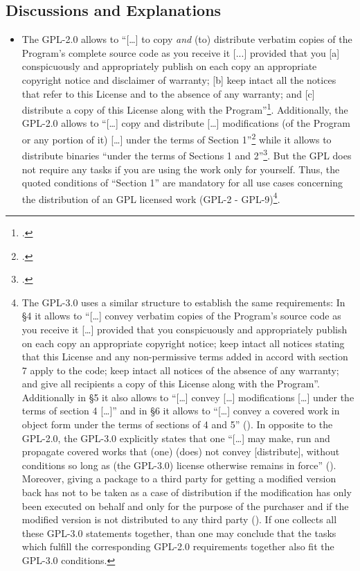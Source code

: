\subsection{Discussions and Explanations}

\begin{itemize}
  
  \item The GPL-2.0 allows to \enquote{[\ldots] to copy \emph{and} (to)
  distribute verbatim copies of the Program's complete source code as you
  receive it [...] provided that you [a] conspicuously and appropriately publish
  on each copy an appropriate copyright notice and disclaimer of warranty; [b]
  keep intact all the notices that refer to this License and to the absence of
  any warranty; and [c] distribute a copy of this License along with the
  Program}\footcite[cf.][\nopage wp.\ §1, emphasizes by
  KR]{Gpl20OsiLicense1991a}. Additionally, the GPL-2.0 allows to
  \enquote{[\ldots] copy and distribute [\ldots] modifications (of the Program
  or any portion of it) [\ldots] under the terms of Section
  1}\footcite[cf.][\nopage wp.\ §2]{Gpl20OsiLicense1991a} while it allows to
  distribute binaries \enquote{under the terms of Sections 1 and
  2}\footcite[cf.][\nopage wp.\ §4]{Gpl20OsiLicense1991a}. But the GPL does not
  require any tasks if you are using the work only for yourself. Thus, the
  quoted conditions of \enquote{Section 1} are mandatory for all use cases
  concerning the distribution of an GPL licensed work (GPL-2 - GPL-9)\footnote{
  \label{Gpl3ConditionsDistri}
  The GPL-3.0 uses a similar structure to establish the same requirements:
  In §4 it allows to \enquote{[\ldots] convey verbatim copies of the Program's
  source code as you receive it [\ldots] provided that you conspicuously and
  appropriately publish on each copy an appropriate copyright notice; keep
  intact all notices stating that this License and any non-permissive terms
  added in accord with section 7 apply to the code; keep intact all notices of
  the absence of any warranty; and give all recipients a copy of this License
  along with the Program}. Additionally in §5 it also allows to
  \enquote{[\ldots] convey [\ldots] modifications [\ldots] under the terms of
  section 4 [\ldots]} and in §6 it allows to \enquote{[\ldots] convey a covered
  work in object form under the terms of sections of 4 and 5}
  (\cite[cf.][\nopage wp.\ §4, §5, §6]{Gpl30OsiLicense2007a}). In opposite to
  the GPL-2.0, the GPL-3.0 explicitly states that one \enquote{[\ldots] may
  make, run and propagate covered works that (one) (does) not convey
  [distribute], without conditions so long as (the GPL-3.0) license otherwise
  remains in force} (\cite[cf.][\nopage wp.\ §2]{Gpl30OsiLicense2007a}).
  Moreover, giving a package to a third party for getting a modified version
  back has not to be taken as a case of distribution if the modification has
  only been executed on behalf and only for the purpose of the purchaser and if
  the modified version is not distributed to any third party (\cite[cf.][\nopage
  wp.\ §2]{Gpl30OsiLicense2007a}). If one collects all these GPL-3.0 statements
  together, than one may conclude that the tasks which fulfill the corresponding
  GPL-2.0 requirements together also fit the GPL-3.0 conditions.}.
  

\end{itemize}
